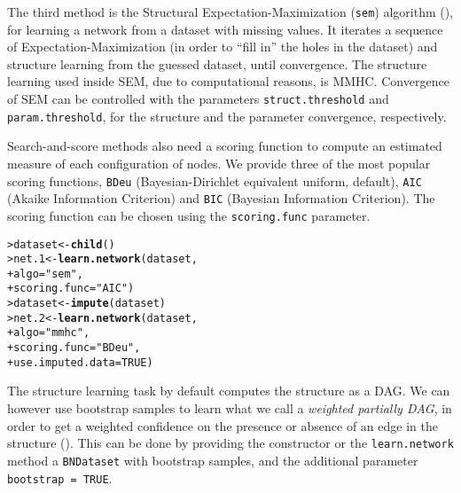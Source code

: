 \documentclass{article}\usepackage[]{graphicx}\usepackage[]{color}
\makeatletter
\newcommand{\hlnum}[1]{\textcolor[rgb]{0.686,0.059,0.569}{#1}}%
\newcommand{\hlstr}[1]{\textcolor[rgb]{0.192,0.494,0.8}{#1}}%
\newcommand{\hlstd}[1]{\textcolor[rgb]{0.345,0.345,0.345}{#1}}%
\newcommand{\hlkwb}[1]{\textcolor[rgb]{0.69,0.353,0.396}{#1}}%
\newcommand{\hlkwc}[1]{\textcolor[rgb]{0.333,0.667,0.333}{#1}}%
\newcommand{\hlkwd}[1]{\textcolor[rgb]{0.737,0.353,0.396}{\textbf{#1}}}%
\newenvironment{kframe}{%
 \def\at@end@of@kframe{}%
 \ifinner\ifhmode%
  \def\at@end@of@kframe{\end{minipage}}%
  \begin{minipage}{\columnwidth}%
 \fi\fi%
 \def\FrameCommand##1{\hskip\@totalleftmargin \hskip-\fboxsep
 \colorbox{shadecolor}{##1}\hskip-\fboxsep
     \hskip-\linewidth \hskip-\@totalleftmargin \hskip\columnwidth}%
 \MakeFramed {\advance\hsize-\width
   \@totalleftmargin\z@ \linewidth\hsize
   \@setminipage}}%
 {\par\unskip\endMakeFramed%
 \at@end@of@kframe}
\newenvironment{knitrout}{}{} %
\newcommand{\Robject}[1]{{\texttt{#1}}}
\newcommand{\Rmethod}[1]{{\texttt{#1}}}
\newcommand{\Rfunarg}[1]{{\texttt{#1}}}
\makeatother
\begin{document}
The third method is the Structural Expectation-Maximization (\texttt{sem}) algorithm (\citet{friedman1997learning,friedman1998bayesian}),
for learning a network from a dataset with missing values. It iterates a sequence of Expectation-Maximization (in order to ``fill in''
the holes in the dataset) and structure learning from the guessed dataset, until convergence. The structure learning used inside SEM,
due to computational reasons, is MMHC. Convergence of SEM can be controlled with the parameters \Rfunarg{struct.threshold}
and \Rfunarg{param.threshold}, for the structure and the parameter convergence, respectively.

Search-and-score methods also need a scoring function to compute an estimated measure of each configuration of nodes.
We provide three of the most popular scoring functions, \texttt{BDeu} (Bayesian-Dirichlet equivalent uniform, default),
\texttt{AIC} (Akaike Information Criterion) and \texttt{BIC} (Bayesian Information Criterion). The scoring function
can be chosen using the \texttt{scoring.func} parameter.

\begin{knitrout}
\color{fgcolor}\begin{kframe}
\begin{alltt}
\hlstd{> }\hlstd{dataset} \hlkwb{<-} \hlkwd{child}\hlstd{()}
\hlstd{> }\hlstd{net.1}   \hlkwb{<-} \hlkwd{learn.network}\hlstd{(dataset,}
\hlstd{+ }                         \hlkwc{algo} \hlstd{=} \hlstr{"sem"}\hlstd{,}
\hlstd{+ }                         \hlkwc{scoring.func} \hlstd{=} \hlstr{"AIC"}\hlstd{)}
\hlstd{> }\hlstd{dataset} \hlkwb{<-} \hlkwd{impute}\hlstd{(dataset)}
\hlstd{> }\hlstd{net.2}   \hlkwb{<-} \hlkwd{learn.network}\hlstd{(dataset,}
\hlstd{+ }                         \hlkwc{algo} \hlstd{=} \hlstr{"mmhc"}\hlstd{,}
\hlstd{+ }                         \hlkwc{scoring.func} \hlstd{=} \hlstr{"BDeu"}\hlstd{,}
\hlstd{+ }                         \hlkwc{use.imputed.data} \hlstd{=} \hlnum{TRUE}\hlstd{)}
\end{alltt}
\end{kframe}
\end{knitrout}

The structure learning task by default computes the structure as a DAG. We can however use
bootstrap samples to learn what we call a \textit{weighted partially DAG}, in order to get a weighted confidence on the presence or
absence of an edge in the structure (\citet*{friedman1999data}). This can be done by providing the constructor or the \Rmethod{learn.network}
method a \Robject{BNDataset} with bootstrap samples, and the additional parameter \Rfunarg{bootstrap = TRUE}.
\end{document}
